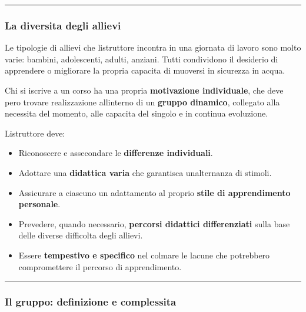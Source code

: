 \documentclass[a4paper,11pt]{article}
\providecommand{\tightlist}{%
  \setlength{\itemsep}{0pt}\setlength{\parskip}{0pt}}
\begin{document}
\begin{center}\rule{0.5\linewidth}{0.5pt}\end{center}

\subsubsection{La diversita degli
      allievi}\label{la-diversita-degli-allievi}

Le tipologie di allievi che l\textquotesingle istruttore incontra in una
giornata di lavoro sono molto varie: bambini, adolescenti, adulti,
anziani. Tutti condividono il desiderio di apprendere o migliorare la
propria capacita di muoversi in sicurezza in acqua.

Chi si iscrive a un corso ha una propria \textbf{motivazione
      individuale}, che deve pero trovare realizzazione
all\textquotesingle interno di un \textbf{gruppo dinamico}, collegato
alla necessita del momento, alle capacita del singolo e in continua
evoluzione.

L\textquotesingle istruttore deve:

\begin{itemize}
      \tightlist
      \item
            Riconoscere e assecondare le \textbf{differenze individuali}.
      \item
            Adottare una \textbf{didattica varia} che garantisca
            un\textquotesingle alternanza di stimoli.
      \item
            Assicurare a ciascuno un adattamento al proprio \textbf{stile di
                  apprendimento personale}.
      \item
            Prevedere, quando necessario, \textbf{percorsi didattici
                  differenziati} sulla base delle diverse difficolta degli allievi.
      \item
            Essere \textbf{tempestivo e specifico} nel colmare le lacune che
            potrebbero compromettere il percorso di apprendimento.
\end{itemize}

\begin{center}\rule{0.5\linewidth}{0.5pt}\end{center}

\subsubsection{Il gruppo: definizione e
      complessita}\label{il-gruppo-definizione-e-complessita}
\end{document}
